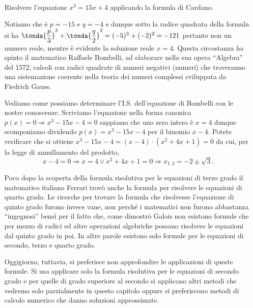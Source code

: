\begin{esempio}
Risolvere l'equazione \(x^3=15x+4\) applicando la formula di Cardano.

Notiamo che è \(p=-15\) e \(q=-4\) e dunque sotto la radice quadrata della 
formula 
si ha \(\tonda{\dfrac p 3}^3+\tonda{\dfrac q 
2}^2=(-5)^3+(-2)^2=-121\) 
pertanto non un numero
reale, mentre è evidente la soluzione reale \(x=4\). Questa circostanza ha 
spinto 
il 
matematico Raffaele Bombelli, ad elaborare nella sua opera ``Algebra'' del 
1572, 
calcoli con radici 
quadrate di numeri negativi (numeri) che troveranno una sistemazione coerente 
nella teoria dei 
numeri complessi sviluppata da Fiedrich Gauss.

Vediamo come possiamo determinare l'I.S. dell'equazione di Bombelli con le 
nostre conoscenze. Scriviamo l'equazione nella forma canonica 
\(p(x)=0\Rightarrow 
x^3-15x-4=0\) sappiamo che uno zero intero è \(x=4\) dunque scomponiamo 
dividendo 
\(p(x)=x^3-15x-4\) per il binomio \(x-4\). Potete verificare che si ottiene 
\(x^3-15x-4=(x-4)\cdot (x^2+4x+1)=0\) da cui, per la legge di annullamento del 
prodotto, 
\[x-4=0\Rightarrow x=4\vee x^2+4x+1=0\Rightarrow x_{1,2}=-2\pm \sqrt 3.\]

Poco dopo la scoperta della formula risolutiva per le equazioni di terzo grado 
il matematico italiano Ferrari trovò anche la formula per risolvere le 
equazioni di quarto grado. 
Le ricerche per trovare la formula che risolvesse l'equazione di quinto grado 
furono invece vane, non perché i matematici non furono abbastanza 
``ingegnosi'' bensì per il fatto che, come dimostrò Galois non esistono 
formule che per mezzo di radici ed altre operazioni algebriche possano 
risolvere le equazioni dal quinto grado in poi. In altre parole esistono 
solo formule per le equazioni di secondo, terzo e quarto grado.

Oggigiorno, tuttavia, si preferisce non approfondire le applicazioni di 
queste formule. 
Si usa applicare solo la formula risolutiva per le equazioni di secondo 
grado e per quelle di grado superiore al secondo si applicano altri metodi 
che vedremo solo parzialmente in questo capitolo oppure si preferiscono
metodi di calcolo numerico che danno soluzioni approssimate.
\end{esempio}

